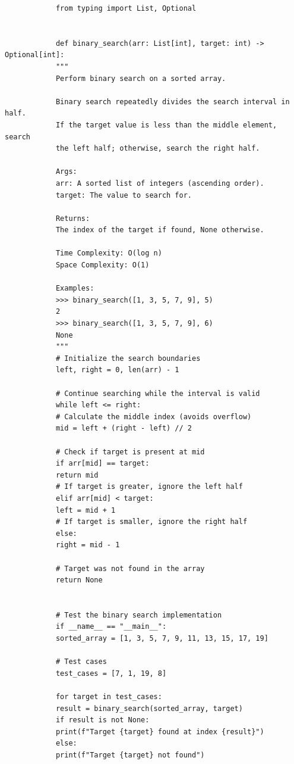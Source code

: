 \documentclass{matinbook}
\begin{document}
    \begin{latin}
        \begin{verbatim}
            from typing import List, Optional
            
            
            def binary_search(arr: List[int], target: int) -> Optional[int]:
            """
            Perform binary search on a sorted array.
            
            Binary search repeatedly divides the search interval in half.
            If the target value is less than the middle element, search
            the left half; otherwise, search the right half.
            
            Args:
            arr: A sorted list of integers (ascending order).
            target: The value to search for.
            
            Returns:
            The index of the target if found, None otherwise.
            
            Time Complexity: O(log n)
            Space Complexity: O(1)
            
            Examples:
            >>> binary_search([1, 3, 5, 7, 9], 5)
            2
            >>> binary_search([1, 3, 5, 7, 9], 6)
            None
            """
            # Initialize the search boundaries
            left, right = 0, len(arr) - 1
            
            # Continue searching while the interval is valid
            while left <= right:
            # Calculate the middle index (avoids overflow)
            mid = left + (right - left) // 2
            
            # Check if target is present at mid
            if arr[mid] == target:
            return mid
            # If target is greater, ignore the left half
            elif arr[mid] < target:
            left = mid + 1
            # If target is smaller, ignore the right half
            else:
            right = mid - 1
            
            # Target was not found in the array
            return None
            
            
            # Test the binary search implementation
            if __name__ == "__main__":
            sorted_array = [1, 3, 5, 7, 9, 11, 13, 15, 17, 19]
            
            # Test cases
            test_cases = [7, 1, 19, 8]
            
            for target in test_cases:
            result = binary_search(sorted_array, target)
            if result is not None:
            print(f"Target {target} found at index {result}")
            else:
            print(f"Target {target} not found")
        \end{verbatim}
    \end{latin}
    \label{code:binary-search}
    
\end{document}
